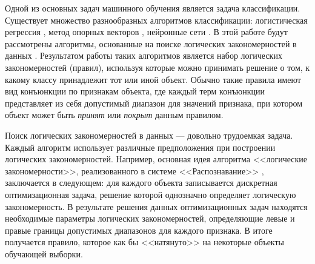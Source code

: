 \documentclass[12pt]{article}
\begin{document}




Одной из основных задач машинного обучения является задача
классификации. Существует множество разнообразных алгоритмов
классификации: логистическая регрессия \cite{hosmer13}, метод опорных
векторов \cite{cortes95}, нейронные сети \cite{bishop95neural}. В этой
работе будут рассмотрены алгоритмы, основанные на поиске логических
закономерностей в данных \cites{ryazanov07logic, kovshov08,
  vainzvaig73kora}. Результатом работы таких алгоритмов является набор
логических закономерностей (правил), используя которые можно принимать
решение о том, к какому классу принадлежит тот или иной объект. Обычно
такие правила имеют вид конъюнкции по признакам объекта, где каждый
терм конъюнкции представляет из себя допустимый диапазон для значений
признака, при котором объект может быть \emph{принят} или
\emph{покрыт} данным правилом.

Поиск логических закономерностей в данных --- довольно трудоемкая
задача. Каждый алгоритм использует различные предположения при
построении логических закономерностей. Например, основная идея
алгоритма <<логические закономерности>>, реализованного в системе
<<Распознавание>> \cite{recognition06}, заключается в следующем: для
каждого объекта записывается дискретная оптимизационная задача,
решение которой однозначно определяет логическую закономерность. В
результате решения данных оптимизационных задач находятся необходимые
параметры логических закономерностей, определяющие левые и правые
границы допустимых диапазонов для каждого признака. В итоге получается
правило, которое как бы <<натянуто>> на некоторые объекты обучающей
выборки.
\end{document}
